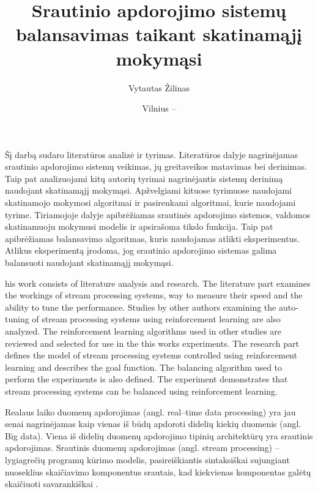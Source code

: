 \documentclass{VUMIFPSbakalaurinis}
\title{Srautinio apdorojimo sistemų balansavimas taikant skatinamąjį mokymąsi}
\author{Vytautas Žilinas}
\date{Vilnius – \the\year}
\begin{document}
 
\maketitle

\cleardoublepage{}
\setcounter{page}{2}

Šį darbą sudaro literatūros analizė ir tyrimas. Literatūros dalyje nagrinėjamas srautinio apdorojimo sistemų veikimas, jų greitaveikos matavimas bei derinimas. Taip pat analizuojami kitų autorių tyrimai nagrinėjantis sistemų derinimą naudojant skatinamąjį mokymąsi. Apžvelgiami kituose tyrimuose naudojami skatinamojo mokymosi algoritmai ir pasirenkami algoritmai, kurie naudojami tyrime. Tiriamojoje dalyje apibrėžiamas srautinės apdorojimo sistemos, valdomos skatinamuoju mokymusi modelis ir apsirašoma tikslo funkcija. Taip pat apibrėžiamas balansavimo algoritmas, kuris naudojamas atlikti eksperimentus. Atlikus eksperimentą įrodoma, jog srautinio apdorojimo sistemas galima balansuoti naudojant skatinamąjį mokymąsi.

his work consists of literature analysis and research. The literature part examines the workings of stream processing systems, way to measure their speed and the ability to tune the performance. Studies by other authors examining the auto-tuning of stream processing systems using reinforcement learning are also analyzed. The reinforcement learning algorithms used in other studies are reviewed and selected for use in the this works experiments. The research part defines the model of stream processing systems controlled using reinforcement learning and describes the goal function. The balancing algorithm used to perform the experiments is also defined. The experiment demonstrates that stream processing systems can be balanced using reinforcement learning.

\tableofcontents


Realaus laiko duomenų apdorojimas (angl. real–time data processing) yra jau senai nagrinėjamas kaip vienas iš būdų apdoroti didelių kiekių duomenis (angl. Big data). Viena iš didelių duomenų apdorojimo tipinių architektūrų yra srautinis apdorojimas. Srautinis duomenų apdorojimas (angl. stream processing) – lygiagrečių programų kūrimo modelis, pasireiškiantis sintaksiškai sujungiant nuoseklius skaičiavimo komponentus srautais, kad kiekvienas komponentas galėtų skaičiuoti savarankiškai \cite{shortstreamproc}. 
\end{document}
